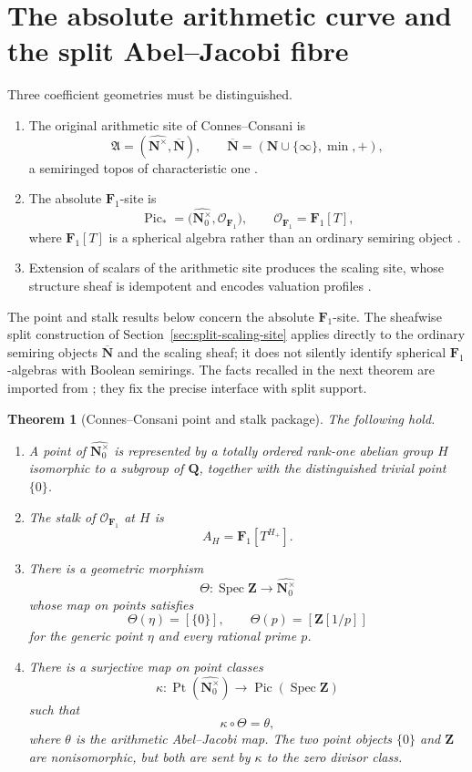 \documentclass[11pt]{amsart}
\numberwithin{equation}{section}
\newtheorem{theorem}{Theorem}[section]
\theoremstyle{definition}
\newcommand{\Z}{\mathbf Z}
\newcommand{\Q}{\mathbf Q}
\newcommand{\N}{\mathbf N}
\newcommand{\Fone}{\mathbf F_1}
\newcommand{\Spec}{\operatorname{Spec}}
\newcommand{\cO}{\mathcal O}
\newcommand{\Nbar}{\overline{\N}}
\begin{document}
\section{The absolute arithmetic curve and the split Abel--Jacobi fibre}
\label{sec:absolute-curve}

Three coefficient geometries must be distinguished.
\begin{enumerate}[label=\textup{(\roman*)}]
\item The original arithmetic site of Connes--Consani is
\[
\mathfrak A=(\widehat{\N^\times},\Nbar),
\qquad
\Nbar=(\N\cup\{\infty\},\min,+),
\]
a semiringed topos of characteristic one \cite{CCArithmeticSite}.
\item The absolute $\Fone$-site is
\[
\operatorname{Pic}_*
 =\bigl(\widehat{\N_0^\times},\cO_{\Fone}\bigr),
\qquad
\cO_{\Fone}=\Fone[T],
\]
where $\Fone[T]$ is a spherical algebra rather than an ordinary semiring
object \cite{CCAbsolute}.
\item Extension of scalars of the arithmetic site produces the scaling
site, whose structure sheaf is idempotent and encodes valuation profiles
\cite{CCScalingSite}.
\end{enumerate}
The point and stalk results below concern the absolute $\Fone$-site.  The
sheafwise split construction of Section~\ref{sec:split-scaling-site}
applies directly to the ordinary semiring objects $\Nbar$ and the scaling
sheaf; it does not silently identify spherical $\Fone$-algebras with
Boolean semirings.  The facts recalled in the next theorem are imported
from \cite{CCAbsolute,CCArithmeticSite}; they fix the precise interface
with split support.

\begin{theorem}[Connes--Consani point and stalk package]
\label{thm:cc-package}
The following hold.
\begin{enumerate}[label=\textup{(\roman*)}]
\item A point of $\widehat{\N_0^\times}$ is represented by a totally ordered
rank-one abelian group $H$ isomorphic to a subgroup of $\Q$, together with
the distinguished trivial point $\{0\}$.
\item The stalk of $\cO_{\Fone}$ at $H$ is
\[
A_H=\Fone[T^{H_+}].
\]
\item There is a geometric morphism
\[
\Theta:\Spec\Z\longrightarrow\widehat{\N_0^\times}
\]
whose map on points satisfies
\[
\Theta(\eta)=[\{0\}],
\qquad
\Theta(p)=[\Z[1/p]]
\]
for the generic point $\eta$ and every rational prime $p$.
\item There is a surjective map on point classes
\[
\kappa:\operatorname{Pt}(\widehat{\N_0^\times})
\longrightarrow \operatorname{Pic}(\Spec\Z)
\]
such that
\[
\kappa\circ\Theta=\theta,
\]
where $\theta$ is the arithmetic Abel--Jacobi map.  The two point objects
$\{0\}$ and $\Z$ are nonisomorphic, but both are sent by $\kappa$ to the
zero divisor class.
\end{enumerate}
\end{theorem}
\end{document}
